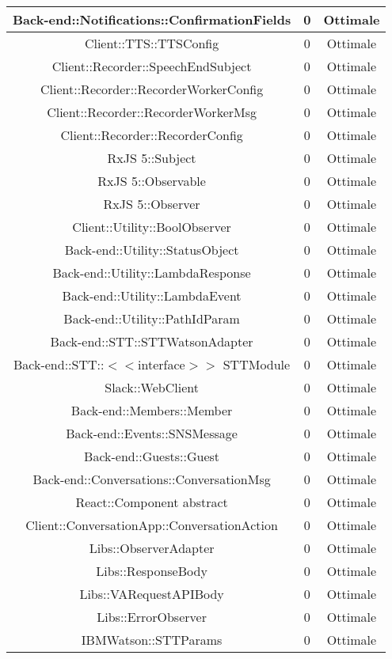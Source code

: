 \begin{longtable}{|c|c|c|}
\hline Back-end::Notifications::ConfirmationFields & 0 & Ottimale \\
\hline Client::TTS::TTSConfig & 0 & Ottimale \\
\hline Client::Recorder::SpeechEndSubject & 0 & Ottimale \\
\hline Client::Recorder::RecorderWorkerConfig & 0 & Ottimale \\
\hline Client::Recorder::RecorderWorkerMsg & 0 & Ottimale \\
\hline Client::Recorder::RecorderConfig & 0 & Ottimale \\
\hline RxJS 5::Subject & 0 & Ottimale \\
\hline RxJS 5::Observable & 0 & Ottimale \\
\hline RxJS 5::Observer & 0 & Ottimale \\
\hline Client::Utility::BoolObserver & 0 & Ottimale \\
\hline Back-end::Utility::StatusObject & 0 & Ottimale \\
\hline Back-end::Utility::LambdaResponse & 0 & Ottimale \\
\hline Back-end::Utility::LambdaEvent & 0 & Ottimale \\
\hline Back-end::Utility::PathIdParam & 0 & Ottimale \\
\hline Back-end::STT::STTWatsonAdapter & 0 & Ottimale \\
\hline Back-end::STT::$<$$<$interface$>$$>$ STTModule & 0 & Ottimale \\
\hline Slack::WebClient & 0 & Ottimale \\
\hline Back-end::Members::Member & 0 & Ottimale \\
\hline Back-end::Events::SNSMessage & 0 & Ottimale \\
\hline Back-end::Guests::Guest & 0 & Ottimale \\
\hline Back-end::Conversations::ConversationMsg & 0 & Ottimale \\
\hline React::Component {abstract} & 0 & Ottimale \\
\hline Client::ConversationApp::ConversationAction & 0 & Ottimale \\
\hline Libs::ObserverAdapter & 0 & Ottimale \\
\hline Libs::ResponseBody & 0 & Ottimale \\
\hline Libs::VARequestAPIBody & 0 & Ottimale \\
\hline Libs::ErrorObserver & 0 & Ottimale \\
\hline IBMWatson::STTParams & 0 & Ottimale \\

\end{longtable}
